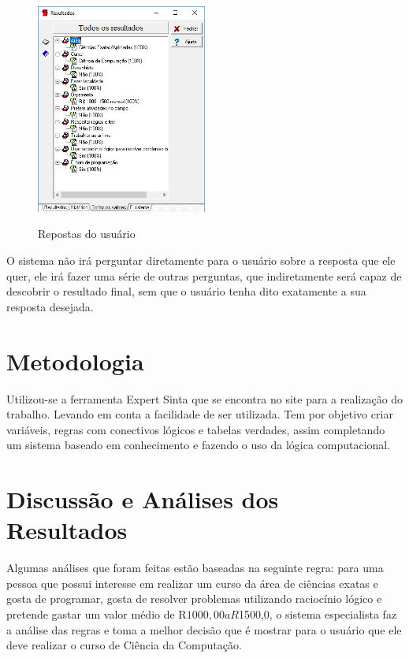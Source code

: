 \begin{figure}[H]
    \centering
    \caption{Repostas do usuário}
    \includegraphics[width=0.5\textwidth]{regras3.PNG}
    \label{regras3}
\end{figure}
O sistema não irá perguntar diretamente para o usuário sobre a resposta que ele quer, ele irá fazer uma série de outras perguntas, que indiretamente será capaz de descobrir o resultado final, sem que o usuário tenha dito exatamente a sua resposta desejada.


\section{Metodologia}
\label{metodologia}

Utilizou-se a ferramenta Expert Sinta que se encontra no {site}\footnotemark {} para a  realização do trabalho. Levando em conta a facilidade de ser utilizada. Tem por objetivo criar variáveis,  regras com conectivos lógicos e tabelas verdades, assim completando um sistema baseado em conhecimento e fazendo o uso da lógica computacional.




\section{Discussão e Análises dos Resultados}
\label{discussão}
Algumas análises que foram feitas estão baseadas na seguinte regra: para uma pessoa que possui interesse em realizar um curso da área de ciências exatas e gosta de programar, gosta de resolver problemas utilizando raciocínio lógico e pretende gastar um valor médio de R$1000,00 a R$1500,0, o sistema especialista faz a análise das regras e toma a melhor decisão que é mostrar para o usuário que ele deve realizar o curso de Ciência da Computação. 





